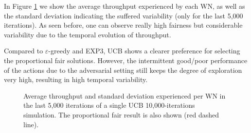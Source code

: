 \documentclass[10pt,journal,compsoc]{IEEEtran}
\begin{document}
	
	In Figure \ref{fig:ucb_avg_individual} we show the average throughput experienced by each WN, as well as the standard deviation indicating the suffered variability (only for the last 5,000 iterations). As seen before, one can observe really high fairness but considerable variability due to the temporal evolution of throughput.	
	
	Compared to $\varepsilon$-greedy and EXP3, UCB shows a clearer preference for selecting the proportional fair solutions. However, the intermittent good/poor performance of the actions due to the adversarial setting still keeps the degree of exploration very high, resulting in high temporal variability.	
	\begin{figure}[t!]
		\centering							
		\caption{Average throughput and standard deviation experienced per WN in the last 5,000 iterations of a single UCB 10,000-iterations simulation. The proportional fair result is also shown (red dashed line).}
		\label{fig:ucb_avg_individual}
	\end{figure}
	
	
\end{document}
